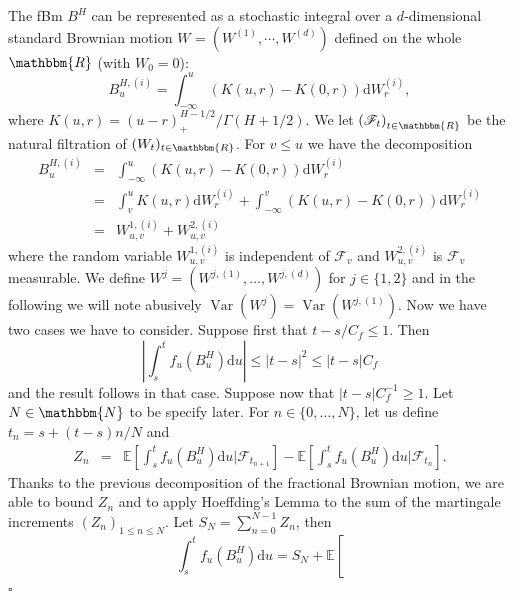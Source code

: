 \documentclass[a4paper,11pt]{article}
\newcommand{\mathd}{\mathrm{d}}
\newcommand{\nobracket}{}
\newcommand{\nocomma}{}
\newcommand{\nosymbol}{}
\newcommand{\tmop}[1]{\ensuremath{\operatorname{#1}}}
\newenvironment{proof}{{\sc Proof.}}{\hfill$\square$}
\newcommand{\CF}{\mathscr F}
\begin{document}
\begin{proof}
  The fBm $B^{H}$ can be represented as a stochastic integral over a
  $d$-dimensional standard Brownian motion $W_{\nosymbol} = (W^{(1)} , \cdots
  , \nocomma W^{(d)} )$ defined on the whole $\mathbbm{R}$ (with $W_{0} =0$):
  \[ B^{H, ( i )}_{u} = \int_{- \infty}^{u} ( K ( u,r ) -K ( 0,r ) ) \mathd
     W^{( i )}_{r} , \]
  where $K ( u,r ) = ( u-r )_{+}^{\nosymbol H-1/2} / \Gamma ( H+1/2 )$. We let
  $\left( \CF_{t} \right)_{t \in \mathbbm{R}}$ be the natural filtration of $(
  W_{t} )_{t \in \mathbbm{R}}$. For $v \leqslant u$ we have the decomposition
  \begin{eqnarray*}
    B^{H, ( i )}_{u} & = & \int_{- \infty}^{u} ( K ( u,r ) -K ( 0,r ) ) \mathd
    W^{( i )}_{r}\\
    & = & \int_{v}^{u} K ( u,r ) \mathd W^{( i )}_{r} + \int_{- \infty}^{v} (
    K ( u,r ) -K ( 0,r ) ) \mathd W^{( i )}_{r}\\
    & = & W_{u,v}^{1, ( i )} +W_{u,v}^{2, ( i )}
  \end{eqnarray*}
  where the random variable $W_{u,v}^{1, ( i )}$ is independent of
  $\mathcal{F}_{v}$ and $W_{u,v}^{2, ( i )}$ is $\mathcal{F}_{v}$ measurable.
  We define $W^{j} = (W^{j, ( 1 )} , \ldots ,W^{j, ( d )} )$ for $j \in \{ 1,2
  \}$ and in the following we will note abusively
  $ \tmop{Var} ( W^{j} ) = \tmop{Var} (W^{j, ( 1 )} ) $.
  Now we have two cases we have to consider. Suppose first that $t-s/C_{f}
  \leqslant 1$. Then
  \[ \left\lvert \int_{s}^{t} f_{u} ( B^{H}_{u} ) \mathd u \right\lvert \leqslant | t-s
     |^{2} \leqslant | t-s | C_{f} \]
  and the result follows in that case. Suppose now that $| t-s | C_{f}^{-1}
  \geqslant 1$. Let $N \in \mathbbm{N}$ to be specify later. For $n \in \{ 0,
  \ldots ,N \}$, let us define \ $t_{n} =s+ ( t-s ) n/N$ and
  \begin{eqnarray*}
    Z_{n} & = & \mathbb{E} \left[ \int_{s}^{t} f_{u} ( B^{H}_{u} )  \text{d} u
    | \mathcal{F}_{t_{n+1}} \nobracket \right] - \mathbb{E} \left[
    \int_{s}^{t} f_{u} ( B^{H}_{u} )  \text{d} u | \mathcal{F}_{t_{n}}
    \nobracket \right] .
  \end{eqnarray*}
  Thanks to the previous decomposition of the fractional Brownian motion, we
  are able to bound $Z_{n}$ and to apply Hoeffding's Lemma to the sum of the
  martingale increments $(Z_{n} )_{1 \leqslant n \leqslant N}$. Let $S_{N} =
  \sum_{n=0}^{N-1} Z_{n}$, then
  \begin{equation}
    \int_{s}^{t} f_{u} ( B^{H}_{u} ) \mathd u=S_{N} + \mathbb{E} \left[

\end{equation}
\end{proof}
\end{document}
